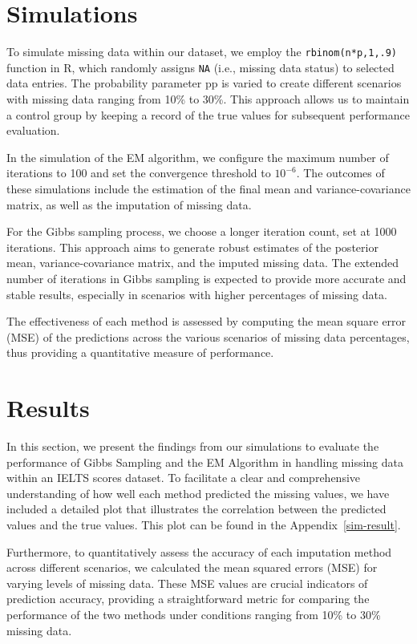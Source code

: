 \documentclass[12pt]{article}
\begin{document}

\section{Simulations}

To simulate missing data within our dataset, we employ the \texttt{rbinom(n*p,1,.9)} function in R, which randomly assigns \texttt{NA} (i.e., missing data status) to selected data entries. The probability parameter pp is varied to create different scenarios with missing data ranging from 10\% to 30\%. This approach allows us to maintain a control group by keeping a record of the true values for subsequent performance evaluation.

In the simulation of the EM algorithm, we configure the maximum number of iterations to 100 and set the convergence threshold to $10^{-6}$. The outcomes of these simulations include the estimation of the final mean and variance-covariance matrix, as well as the imputation of missing data.

For the Gibbs sampling process, we choose a longer iteration count, set at 1000 iterations. This approach aims to generate robust estimates of the posterior mean, variance-covariance matrix, and the imputed missing data. The extended number of iterations in Gibbs sampling is expected to provide more accurate and stable results, especially in scenarios with higher percentages of missing data.

The effectiveness of each method is assessed by computing the mean square error (MSE) of the predictions across the various scenarios of missing data percentages, thus providing a quantitative measure of performance.

\section{Results}

In this section, we present the findings from our simulations to evaluate the performance of Gibbs Sampling and the EM Algorithm in handling missing data within an IELTS scores dataset. To facilitate a clear and comprehensive understanding of how well each method predicted the missing values, we have included a detailed plot that illustrates the correlation between the predicted values and the true values. This plot can be found in the Appendix~\ref{sim-result}.

Furthermore, to quantitatively assess the accuracy of each imputation method across different scenarios, we calculated the mean squared errors (MSE) for varying levels of missing data. These MSE values are crucial indicators of prediction accuracy, providing a straightforward metric for comparing the performance of the two methods under conditions ranging from 10\% to 30\% missing data. 
\end{document}
